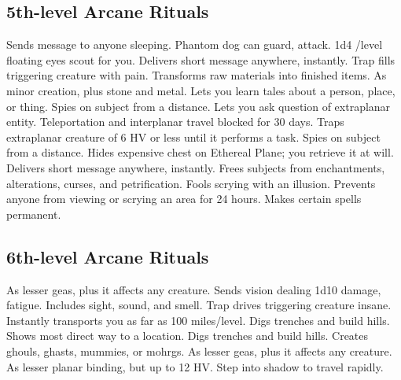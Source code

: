 \subsection{5th-level Arcane Rituals}
\begin{rituallist}
 Sends message to anyone sleeping.
 Phantom dog can guard, attack.
 1d4 /level floating eyes scout for you.
 Delivers short message anywhere, instantly.
 Trap fills triggering creature with pain.
 Transforms raw materials into finished items.
 As minor creation, plus stone and metal.
\F Lets you learn tales about a person, place, or thing.
\F Spies on subject from a distance.
 Lets you ask question of extraplanar entity.
 Teleportation and interplanar travel blocked for 30 days.
 Traps extraplanar creature of 6 HV or less until it performs a task.
\F Spies on subject from a distance.
\F Hides expensive chest on Ethereal Plane; you retrieve it at will.
 Delivers short message anywhere, instantly.
 Frees subjects from enchantments, alterations, curses, and petrification.
 Fools scrying with an illusion.
 Prevents anyone from viewing or scrying an area for 24 hours.
 Makes certain spells permanent.
\end{rituallist}

\subsection{6th-level Arcane Rituals}
\begin{rituallist}
 As lesser geas, plus it affects any creature.
 Sends vision dealing 1d10 damage, fatigue.
 Includes sight, sound, and smell.
 Trap drives triggering creature insane.
 Instantly transports you as far as 100 miles/level.
 Digs trenches and build hills.
 Shows most direct way to a location.
 Digs trenches and build hills.
 Creates ghouls, ghasts, mummies, or mohrgs.
 As lesser geas, plus it affects any creature.
 As lesser planar binding, but up to 12 HV.
 Step into shadow to travel rapidly.
\end{rituallist}

